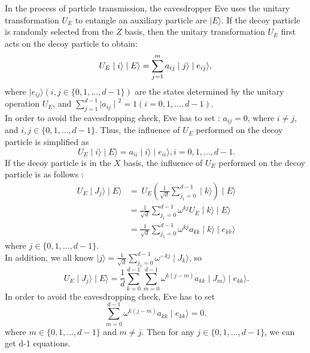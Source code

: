\documentclass[pdflatex,sn-mathphys]{sn-jnl}%
\theoremstyle{thmstyleone}%
\theoremstyle{thmstyletwo}%
\theoremstyle{thmstylethree}%
\begin{document}
  In the process of particle transmission, the eavesdropper Eve uses the unitary transformation $U_E$ to entangle an auxiliary particle are $ \mid E \rangle$. If the decoy particle is randomly selected from the $Z$ basis, then the unitary transformation $U_E$ first acts on the decoy particle to obtain:  
\begin{equation}
U_E\mid i\rangle\mid E \rangle =\sum_{j=1}^{m}a_{ij}\mid j \rangle\mid e_{ij}\rangle, \notag
\end{equation}
where $\mid e_{ij}\rangle (i,j\in\lbrace{0,1,\dots,d-1}\rbrace)$ are the states determined by the unitary operation $U_E$, and $\sum_{j=1}^{d-1}{\mid a_{ij}\mid}^2=1(i=0,1,\dots,d-1)$.\\
\indent In order to avoid the eavesdropping check, Eve has to set : $a_{ij}=0$, where $i\ne j$, and $i,j \in\lbrace{0,1,\dots,d-1}\rbrace$. Thus, the influence of $U_E$ performed on the decoy particle is simplified as
\begin{equation*}
\ U_E\mid i\rangle\mid E\rangle=a_{ii}\mid i\rangle\mid e_{ii}\rangle, i=0,1,\dots,d-1.
\end{equation*}
\indent If the decoy particle is in the $X$ basis, the influence of $U_E$ performed on the decoy particle is as follows :
\begin{equation*}  \begin{split}
\ U_E\mid J_j\rangle\mid E\rangle &=\ U_E(\frac{1}{\sqrt{d}}\sum_{j_1=0}^{d-1}\mid k\rangle)\mid E\rangle \\
 &=\frac{1}{\sqrt{d}}\sum_{j_1=0}^{d-1}\omega^{kj}U_E\mid k\rangle\mid E\rangle \\
 &=\frac{1}{\sqrt{d}}\sum_{j_1=0}^{d-1}\omega^{kj}a_{kk}\mid k\rangle\mid e_{kk}\rangle
\end{split}   \end{equation*}
where $j \in \lbrace{0,1,\dots,d-1}\rbrace$.\\
\indent In addition, we all know $\mid j\rangle=\frac{1}{\sqrt{d}}\sum_{j_1=0}^{d-1}\omega^{-kj}\mid J_k\rangle$, so
\begin{equation*}
\ U_E\mid J_j\rangle\mid E\rangle=\frac{1}{d}\sum_{k=0}^{d-1}\sum_{m=0}^{d-1}\omega^{k(j-m)}a_{kk}\mid J_m\rangle\mid e_{kk}\rangle.
\end{equation*}
\indent In order to avoid the eavesdropping check, Eve has to set
\begin{equation*}
\sum_{m=0}^{d-1}\omega^{k(j-m)}a_{kk}\mid e_{kk}\rangle=0.
\end{equation*}
where $m \in \lbrace{0,1,\dots,d-1}\rbrace$ and $m\ne j$. Then for any $j\in \lbrace{0,1,\dots,d-1}\rbrace$, we can get d-1 equations.
\end{document}
